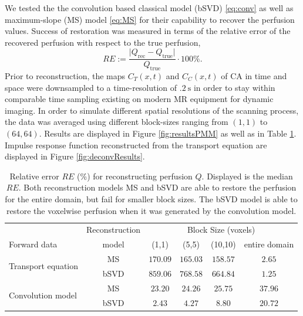\documentclass[paper=a4, fontsize=11pt,parskip=half,headings=small]{scrartcl}
\newcommand{\Perf}{Q}
\begin{document}
	We tested the the convolution based classical model (bSVD) \eqref{eq:conv} as well as maximum-slope (MS) model \eqref{eq:MS} for their capability to recover the perfusion values.
	Success of restoration was measured in terms of the relative error of the recovered perfusion with respect to the true perfusion,
	\begin{equation}
		RE := \frac{\vert \Perf_{\mathrm{rec}} - \Perf_{\mathrm{true}}\vert}{\Perf_{\mathrm{true}}}\cdot 100\%.
	\end{equation}
	Prior to reconstruction, the maps $C_T(x,t)$ and $C_C(x,t)$ of CA in time and space were downsampled to a time-resolution of $\SI{.2}{\second}$ in order to stay within comparable time sampling existing on modern MR equipment for dynamic imaging.
	In order to simulate different spatial resolutions of the scanning process, the data was averaged using different block-sizes ranging from $(1,1)$ to $(64,64)$.
	Results are displayed in Figure \ref{fig:resultsPMM} as well as in Table \ref{tab:resultsSim}.
	Impulse response function reconstructed from the transport equation are displayed in Figure \ref{fig:deconvResults}.	
	
	\begin{table}[H]
		\caption{Relative error $RE$ (\%) for reconstructing perfusion $\Perf$. Displayed is the median $RE$. Both reconstruction models MS and bSVD are able to restore the perfusion for the entire domain, but fail for smaller block sizes. The bSVD model is able to restore the voxelwise perfusion when it was generated by the convolution model. }
		\centering
		\begin{tabular}{l c c c c c }
			 & Reconstruction & \multicolumn{4}{c}{Block Size (voxels)}\\
			Forward data 		& model		& (1,1) 	& (5,5)		& (10,10)	& entire domain \\
			\toprule
			\multirow{2}{*}{Transport equation} & MS 	& $170.09$ 	& $165.03$ 	& $158.57$	& $2.65$ \\
			 					 	   		& bSVD  & $859.06$ 	& $768.58$ 	& $664.84$	& $1.25$ \\
			\multirow{2}{*}{Convolution model} & MS 	& $23.20$ 	& $24.26$ 	& $25.75$ 	& $37.96$ \\
			 					 			& bSVD  & $2.43$ 	& $4.27$ 	& $8.80$ 	& $20.72$ \\
		\end{tabular}
		\label{tab:resultsSim}
	\end{table}
\end{document}
